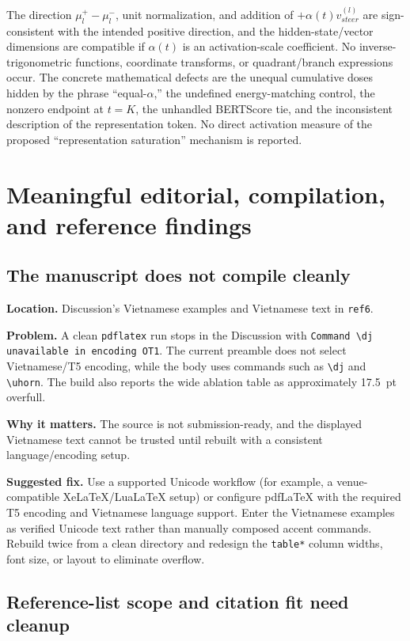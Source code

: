 \documentclass[11pt]{article}
\newcommand{\findinglabel}[1]{\textbf{#1}}
\begin{document}
The direction $\mu_l^+-\mu_l^-$, unit normalization, and addition of $+\alpha(t)v_{steer}^{(l)}$ are sign-consistent with the intended positive direction, and the hidden-state/vector dimensions are compatible if $\alpha(t)$ is an activation-scale coefficient.  No inverse-trigonometric functions, coordinate transforms, or quadrant/branch expressions occur.  The concrete mathematical defects are the unequal cumulative doses hidden by the phrase ``equal-$\alpha$,'' the undefined energy-matching control, the nonzero endpoint at $t=K$, the unhandled BERTScore tie, and the inconsistent description of the representation token.  No direct activation measure of the proposed ``representation saturation'' mechanism is reported.

\section*{Meaningful editorial, compilation, and reference findings}

\subsection*{The manuscript does not compile cleanly}

\findinglabel{Location.} Discussion's Vietnamese examples and Vietnamese text in \texttt{ref6}.

\findinglabel{Problem.} A clean \texttt{pdflatex} run stops in the Discussion with \texttt{Command \textbackslash dj unavailable in encoding OT1}.  The current preamble does not select Vietnamese/T5 encoding, while the body uses commands such as \verb|\dj| and \verb|\uhorn|.  The build also reports the wide ablation table as approximately 17.5~pt overfull.

\findinglabel{Why it matters.} The source is not submission-ready, and the displayed Vietnamese text cannot be trusted until rebuilt with a consistent language/encoding setup.

\findinglabel{Suggested fix.} Use a supported Unicode workflow (for example, a venue-compatible XeLaTeX/LuaLaTeX setup) or configure pdfLaTeX with the required T5 encoding and Vietnamese language support.  Enter the Vietnamese examples as verified Unicode text rather than manually composed accent commands.  Rebuild twice from a clean directory and redesign the \texttt{table*} column widths, font size, or layout to eliminate overflow.

\subsection*{Reference-list scope and citation fit need cleanup}
\end{document}
